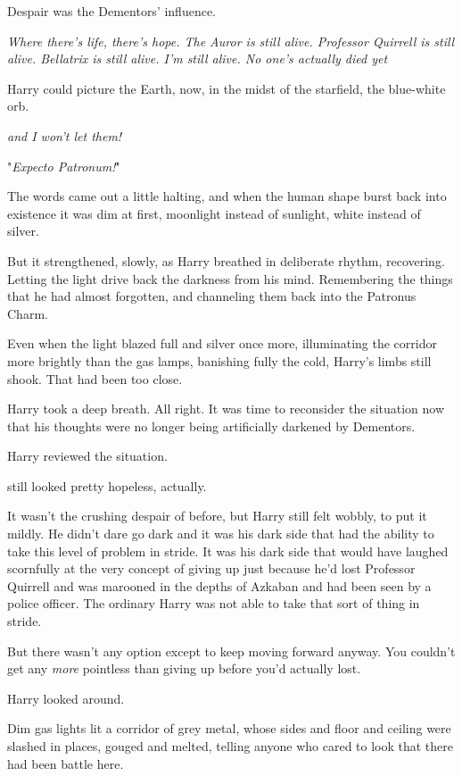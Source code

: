 Despair was the Dementors' influence.

\emph{Where there's life, there's hope. The Auror is still alive. Professor
Quirrell is still alive. Bellatrix is still alive. I'm still alive. No one's
actually died yet{\el}}

Harry could picture the Earth, now, in the midst of the starfield, the
blue-white orb.

\emph{{\el}and I won't let them!}

"\emph{Expecto Patronum!}"

The words came out a little halting, and when the human shape burst back into
existence it was dim at first, moonlight instead of sunlight, white instead of
silver.

But it strengthened, slowly, as Harry breathed in deliberate rhythm,
recovering. Letting the light drive back the darkness from his mind.
Remembering the things that he had almost forgotten, and channeling them back
into the Patronus Charm.

Even when the light blazed full and silver once more, illuminating the corridor
more brightly than the gas lamps, banishing fully the cold, Harry's limbs still
shook. That had been too close.

Harry took a deep breath. All right. It was time to reconsider the situation
now that his thoughts were no longer being artificially darkened by Dementors.

Harry reviewed the situation.

{\el} still looked pretty hopeless, actually.

It wasn't the crushing despair of before, but Harry still felt wobbly, to put
it mildly. He didn't dare go dark and it was his dark side that had the ability
to take this level of problem in stride. It was his dark side that would have
laughed scornfully at the very concept of giving up just because he'd lost
Professor Quirrell and was marooned in the depths of Azkaban and had been seen
by a police officer. The ordinary Harry was not able to take that sort of thing
in stride.

But there wasn't any option except to keep moving forward anyway. You couldn't
get any \emph{more} pointless than giving up before you'd actually lost.

Harry looked around.

Dim gas lights lit a corridor of grey metal, whose sides and floor and ceiling
were slashed in places, gouged and melted, telling anyone who cared to look
that there had been battle here.

